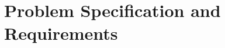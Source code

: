 \chapter{Problem Specification and Requirements}
\label{ch:problem_specification_and_requirements}



